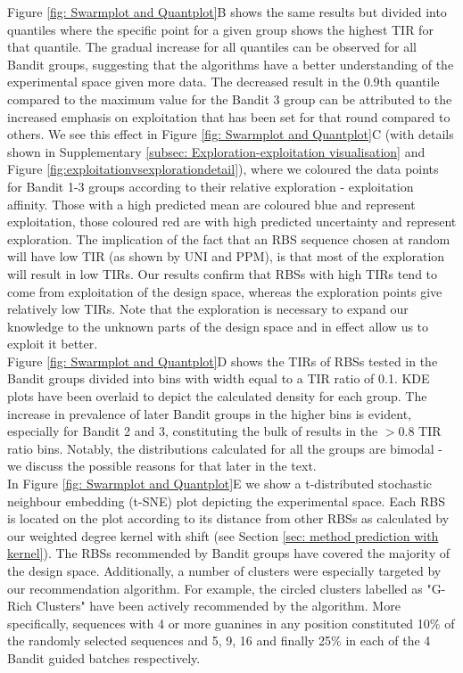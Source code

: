 \documentclass{article}
\begin{document}
Figure \ref{fig: Swarmplot and Quantplot}B shows the same results but divided into quantiles where the specific point for a given group shows the highest TIR for that quantile.
The gradual increase for all quantiles can be observed for all Bandit groups, suggesting that the algorithms have a better understanding of the experimental space given more data.
The decreased result in the 0.9th quantile compared to the maximum value for the Bandit 3 group can be attributed to the increased emphasis on exploitation that has been set for that round compared to others.
We see this effect in Figure \ref{fig: Swarmplot and Quantplot}C (with details shown in Supplementary \ref{subsec: Exploration-exploitation visualisation} and Figure  \ref{fig:exploitationvsexplorationdetail}), where we coloured the data points for Bandit 1-3 groups according to their relative exploration - exploitation affinity.
Those with a high predicted mean are coloured blue and represent exploitation, those coloured red are with high predicted uncertainty and represent exploration.
The implication of the fact that an RBS sequence chosen at random will have low TIR
(as shown by UNI and PPM), is that most of the exploration will result in low TIRs.
Our results confirm that RBSs with high TIRs tend to come from exploitation of the design space,
whereas the exploration points give relatively low TIRs.
Note that the exploration is necessary to expand our knowledge to the unknown parts of the design space and in effect allow us to exploit it better.\\

Figure \ref{fig: Swarmplot and Quantplot}D shows the TIRs of RBSs tested in the Bandit groups divided into bins with width equal to a TIR ratio of 0.1.
KDE plots have been overlaid to depict the calculated density for each group.
The increase in prevalence of later Bandit groups in the higher bins is evident, especially for Bandit 2 and 3, constituting the bulk of results in the $>0.8$ TIR ratio bins.
Notably, the distributions calculated for all the groups are bimodal - we discuss the possible reasons for that later in the text.\\


In Figure \ref{fig: Swarmplot and Quantplot}E we show a t-distributed stochastic neighbour embedding (t-SNE) \mbox{\cite{tsne2008}} plot depicting the experimental space.
Each RBS is located on the plot according to its distance from other RBSs as calculated by our weighted degree kernel with shift (see Section \mbox{\ref{sec: method prediction with kernel}}).
The RBSs recommended by Bandit groups have covered the majority of the design space.
Additionally, a number of clusters were especially targeted by our recommendation algorithm.
For example, the circled clusters labelled as "G-Rich Clusters" have been actively recommended by the algorithm.
More specifically, sequences with 4 or more guanines in any position constituted 10\% of the randomly selected sequences and 5, 9, 16 and finally 25\% in each of the 4 Bandit guided batches respectively.
\end{document}
